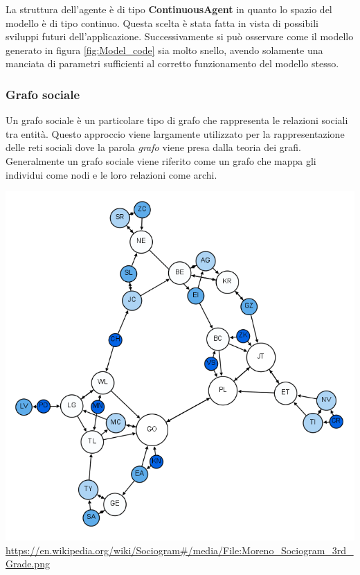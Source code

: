 La struttura dell'agente è di tipo \textbf{ContinuousAgent} in quanto lo 
spazio del modello è di tipo continuo. Questa scelta è stata fatta in vista di possibili 
sviluppi futuri dell'applicazione. Successivamente si può osservare come il modello generato 
in figura \ref{fig:Model_code} sia molto snello, avendo solamente una manciata di parametri 
sufficienti al corretto funzionamento del modello stesso. 

\subsubsection*{Grafo sociale}
Un grafo sociale è un particolare tipo di grafo che rappresenta le relazioni sociali tra entità.
Questo approccio viene largamente utilizzato per la rappresentazione delle reti sociali dove la 
parola \emph{grafo} viene presa dalla teoria dei grafi. Generalmente un grafo sociale viene riferito come un
grafo che mappa gli individui come nodi e le loro relazioni come archi. 

\begin{minipage}{\linewidth}
    \centering
    \includegraphics[width=\textwidth]{img/Moreno_Sociogram_3rd_Grade.png}
	\url{https://en.wikipedia.org/wiki/Sociogram#/media/File:Moreno_Sociogram_3rd_Grade.png}
    \label{fig:social_graph}
\end{minipage}

